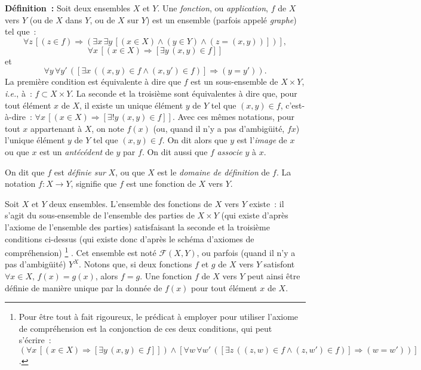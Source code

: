 \noindent\textbf{Définition :} Soit deux ensembles $X$ et $Y$. Une \textit{fonction}, ou \textit{application}, $f$ de $X$ vers $Y$ (ou de $X$ dans $Y$, ou de $X$ sur $Y$) est un ensemble (parfois appelé \textit{graphe}) tel que : 
\begin{equation*}
    \forall z \, [ (z \in f) \Rightarrow (\exists x \, \exists y \, [(x \in X) \wedge (y \in Y) \wedge (z = (x,y))])],
\end{equation*}
\begin{equation*}
    \forall x \, [(x \in X) \Rightarrow [\exists y \, (x,y) \in f]]
\end{equation*}
et 
\begin{equation*}
    \forall y \, \forall y' \, ([\exists x \, ((x,y) \in f \wedge (x,y') \in f)] \Rightarrow (y = y')).
\end{equation*}
La première condition est équivalente à dire que $f$ est un sous-ensemble de $X \times Y$, \textit{i.e.}, à : $f \subset X \times Y$. 
La seconde et la troisième sont équivalentes à dire que, pour tout élément $x$ de $X$, il existe un unique élément $y$ de $Y$ tel que $(x,y) \in f$, c'est-à-dire : $\forall x \, [(x \in X) \Rightarrow [\exists ! y \, (x,y) \in f]]$. 
Avec ces mêmes notations, pour tout $x$ appartenant à $X$, on note $f(x)$ (ou, quand il n'y a pas d'ambigüité, $f x$) l'unique élément $y$ de $Y$ tel que $(x,y) \in f$. 
On dit alors que $y$ est l'\textit{image} de $x$ ou que $x$ est un \textit{antécédent} de $y$ par $f$. 
On dit aussi que $f$ \textit{associe} $y$ à $x$. 

On dit que $f$ est \textit{définie sur} $X$, ou que $X$ est le \textit{domaine de définition} de $f$. 
La notation $f: X \to Y$, signifie que $f$ est une fonction de $X$ vers $Y$. 

Soit $X$ et $Y$ deux ensembles. 
L'ensemble des fonctions de $X$ vers $Y$ existe : il s'agit du sous-ensemble de l'ensemble des parties de $X \times Y$ (qui existe d'après l'axiome de l'ensemble des parties) satisfaisant la seconde et la troisième conditions ci-dessus (qui existe donc d'après le schéma d'axiomes de compréhension)%
\footnote{Pour être tout à fait rigoureux, le prédicat à employer pour utiliser l'axiome de compréhension est la conjonction de ces deux conditions, qui peut s'écrire : $(\forall x \, [(x \in X) \Rightarrow [\exists y \, (x,y) \in f]]) \wedge [\forall w \, \forall w' \, ([\exists z \, ((z,w) \in f \wedge (z,w') \in f)] \Rightarrow (w = w'))]$.}%
. 
Cet ensemble est noté $\mathcal{F}(X,Y)$, ou parfois (quand il n'y a pas d'ambigüité) $Y^X$. 
Notons que, si deux fonctions $f$ et $g$ de $X$ vers $Y$ satisfont $\forall x \in X, \, f(x) = g(x)$, alors $f = g$. 
Une fonction $f$ de $X$ vers $Y$ peut ainsi être définie de manière unique par la donnée de $f(x)$ pour tout élément $x$ de $X$.


